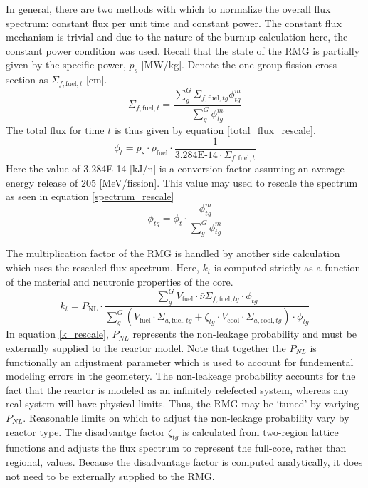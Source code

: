 In general, there are two methods with which to normalize the overall flux spectrum: constant flux
per unit time and constant power.  The constant flux mechanism is trivial and due to the nature of 
the burnup calculation here, the constant power condition was used.  Recall that the state of the 
RMG is partially given by the specific power, $p_s$ [MW/kg].  Denote the one-group fission cross
section as $\Sigma_{f,\mbox{fuel},t}$ [cm].
\begin{equation}
\label{one_group_fission}
\Sigma_{f,\mbox{fuel},t} = \frac{\sum_g^G \Sigma_{f,\mbox{fuel},tg}\phi_{tg}^m}
                                {\sum_g^G \phi_{tg}^m}
\end{equation}
The total flux for time $t$ is thus given by equation \ref{total_flux_rescale}.
\begin{equation}
\label{total_flux_rescale}
\phi_t = p_s \cdot  \rho_{\mbox{fuel}} \cdot \frac{1}
                                                  {\mbox{3.284E-14} \cdot \Sigma_{f,\mbox{fuel},t}}
\end{equation}
Here the value of 3.284E-14 [kJ/n] is a conversion factor assuming an average 
energy release of 205 [MeV/fission].  This value may used to rescale the spectrum 
as seen in equation \ref{spectrum_rescale}
\begin{equation}
\label{spectrum_rescale}
\phi_{tg} = \phi_t \cdot  \frac{\phi_{tg}^m}
                               {\sum_g^G \phi_{tg}^m}
\end{equation}

The multiplication factor of the RMG is handled by another side calculation which 
uses the rescaled flux spectrum.  Here, $k_t$ is computed strictly as a function of the 
material and neutronic properties of the core.
\begin{equation}
\label{k_rescale}
k_t = P_{\mbox{NL}} \cdot \frac{\sum_g^G V_{\mbox{fuel}} \cdot \bar{\nu}\Sigma_{f,\mbox{fuel},tg} \cdot \phi_{tg}}
                                {\sum_g^G \left(V_{\mbox{fuel}} \cdot \Sigma_{a,\mbox{fuel},tg} + \zeta_{tg} \cdot V_{\mbox{cool}} \cdot \Sigma_{a,\mbox{cool},tg}\right) \cdot  \phi_{tg}}
\end{equation}
In equation \ref{k_rescale}, $P_{NL}$ represents the non-leakage probability and must be externally supplied
to the reactor model.  Note that together the $P_{NL}$ is functionally an adjustment parameter
which is used to account for fundemental modeling errors in the geometery.  The non-leakeage 
probability accounts for the fact that the reactor is modeled as an infinitely relefected system, whereas
any real system will have physical limits.  Thus, the RMG may be `tuned'
by variying $P_{NL}$.  Reasonable limits on which to adjust the non-leakage probability
vary by reactor type.  The disadvantge factor $\zeta_{tg}$ is calculated from two-region lattice functions
and adjusts the flux spectrum to represent the full-core, rather than regional, values.  Because the 
disadvantage factor is computed analytically, it does not need to be externally supplied to the RMG.


